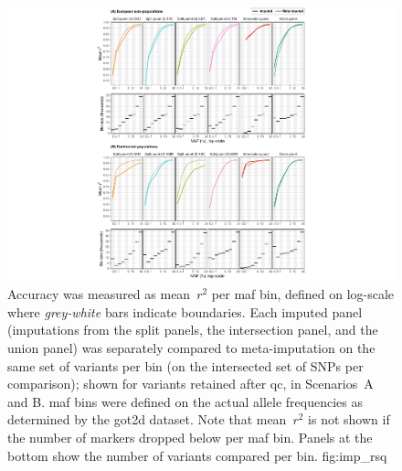 

\begin{figure}[p]
\includegraphics[width=\textwidth]{./img/ch2/accuracy_imp_maf_rsq}
{Accuracy was measured as mean~$r^2$ per \gls{maf} bin, defined on log-scale where \emph{grey-white} bars indicate boundaries.
Each imputed panel (imputations from the  split panels, the intersection panel, and the union panel) was separately compared to meta-imputation on the same set of variants per bin (\ie on the intersected set of SNPs per comparison); shown for variants retained after \gls{qc}, in Scenarios~A and B.
\Gls{maf} bins were defined on the actual allele frequencies as determined by the \gls{got2d} dataset.
Note that mean~$r^2$ is not shown if the number of markers dropped below  per \gls{maf} bin.
Panels at the bottom show the number of variants compared per bin.}
{fig:imp_rsq}
\end{figure}
